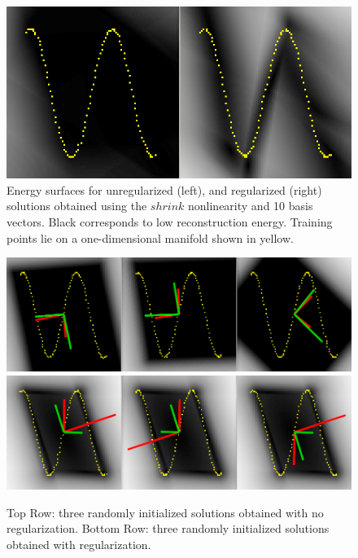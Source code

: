 \documentclass{article} %
\begin{document}
\begin{figure}
\centering 
\includegraphics[scale=0.25]{./Figures/toy_shrink.png}
\caption{Energy surfaces for unregularized (left), and regularized (right) solutions obtained using the $shrink$ nonlinearity and 10 basis vectors. Black corresponds to low reconstruction energy. Training points lie on a one-dimensional manifold shown in yellow.}  
\label{fig:toyshrink}
\end{figure} 

\begin{figure}
\centering 
\includegraphics[scale=0.25]{./Figures/toy_sat_linear_noreg.png}
\includegraphics[scale=0.25]{./Figures/toy_sat_linear_reg.png}
\caption{Top Row: three randomly initialized solutions obtained with no regularization. Bottom Row: three randomly initialized solutions obtained with regularization.}  
\label{fig:toysatlinear} 
\end{figure} 
\end{document}
